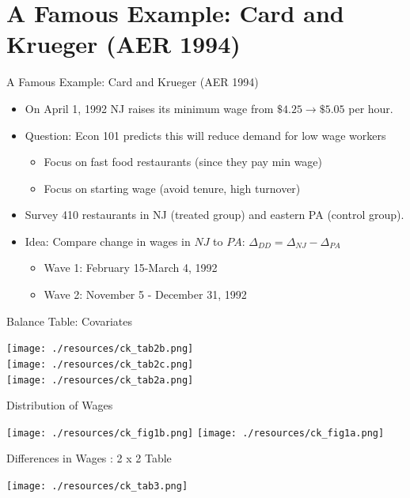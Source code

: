 \section{A Famous Example: Card and Krueger (AER 1994)}

\begin{frame}{A Famous Example: Card and Krueger (AER 1994)}
\begin{itemize}
\item On April 1, 1992 NJ raises its minimum wage from $\$4.25\rightarrow \$5.05$ per hour.
\item Question: Econ 101 predicts this will \alert{reduce demand for low wage workers}
\begin{itemize}
\item Focus on fast food restaurants (since they pay min wage)
\item Focus on starting wage (avoid tenure, high turnover)
\end{itemize}
\item Survey 410 restaurants in NJ (treated group) and eastern PA (control group).
\item Idea: Compare \alert{change} in wages in $NJ$ to $PA$:  $\Delta_{DD} = \Delta_{NJ}- \Delta_{PA}$
\begin{itemize}
\item Wave 1: February 15-March 4, 1992
\item Wave 2: November 5 - December 31, 1992
\end{itemize}
\end{itemize}
\end{frame}

\begin{frame}{Balance Table: Covariates}
\begin{center}
\texttt{[image: ./resources/ck\_tab2b.png]}\\
\texttt{[image: ./resources/ck\_tab2c.png]}\\
\texttt{[image: ./resources/ck\_tab2a.png]}
\end{center}
\end{frame}



\begin{frame}{Distribution of Wages}
\begin{center}
\texttt{[image: ./resources/ck\_fig1b.png]}
\texttt{[image: ./resources/ck\_fig1a.png]}
\end{center}
\end{frame}


\begin{frame}{Differences in Wages : 2 x 2 Table}
\begin{center}
\texttt{[image: ./resources/ck\_tab3.png]}
\end{center}
\end{frame}

